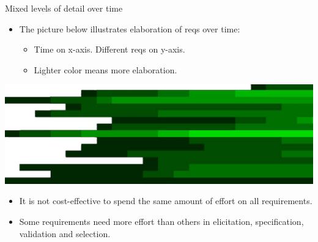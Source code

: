 \begin{Slide}{Mixed levels of detail over time}

\begin{itemize}
\item The picture below illustrates elaboration of reqs over time:
\begin{itemize}
\item Time on x-axis. Different reqs on y-axis. 
\item Lighter color means more elaboration.

\end{itemize}
\end{itemize}
\begin{minipage}[t]{1.0\textwidth}
\vspace{-1.0em}\includegraphics[width=1.0\textwidth]{../img/details-time}
\end{minipage}


\begin{itemize}
\item It is not cost-effective to spend the same amount of effort on all requirements.

\item Some requirements need more effort than others in elicitation, specification, validation and selection.




\end{itemize}
\end{Slide}